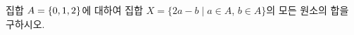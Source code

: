 집합 $A=\{0{,}\mkern3mu\mathopen{}1{,}\mkern3mu\mathopen{}2\}$에 대하여 집합 $X=\{2a-b \mid a\in A$, $b\in A\}$의 모든 원소의 합을 구하시오.
